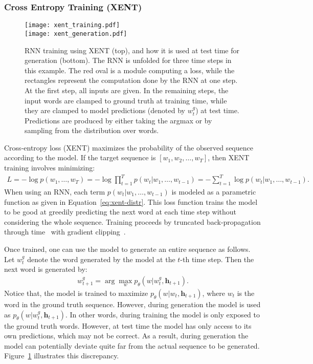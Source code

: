 \documentclass{article} \usepackage{iclr2016_conference,times}
\newcommand{\argmax}{\arg\!\max}
\newcommand{\bh}{\mathbf{h}}
\begin{document}
\subsubsection{Cross Entropy Training (XENT)} \label{model-xent}
\begin{figure}[!t]
	   \texttt{[image: xent\_training.pdf]}\\
	   \texttt{[image: xent\_generation.pdf]}
  \caption{RNN training using XENT (top), and how it is used at test time for generation (bottom). The RNN is unfolded for three time steps in this example. The red oval is a module computing a loss, while the rectangles represent the computation done by the RNN at one step. At the first step, all inputs are given. In the remaining steps, the input words are clamped to ground truth at training time, while they are clamped to model predictions (denoted by $w^g_t$) at test time. Predictions are produced by either taking the argmax or by sampling from the distribution over words. 
}
  \label{fig:xent}
\end{figure}
Cross-entropy loss (XENT) maximizes the probability of the observed sequence according to the model.
If the target sequence is $[w_1, w_2, \dots, w_T]$, then XENT training involves minimizing: 
\begin{align}
L =	- \log p(w_1, \ldots, w_T) = - \log \prod_{t=1}^T p(w_t | w_1, \ldots, w_{t-1}) = - \sum_{t=1}^T \log p(w_t | w_1, \ldots, w_{t-1}).  \label{eq:xenty}
\end{align}
When using an RNN, each term $p(w_t | w_1, \ldots, w_{t-1})$ is modeled as a parametric function as given in Equation~\eqref{eq:xent-distr}. This loss function trains the model to be good at greedily predicting the next word at each time step without considering the whole sequence. Training proceeds by truncated back-propagation through time~\citep{bptt} with gradient clipping~\citep{mikolov-2010}.

Once trained, one can use the model to generate an entire sequence as follows. Let $w^g_t$ denote the word generated by the model at the $t$-th time step. Then the next word  is generated by: 
\begin{align}
  \label{eq:greedy_gen}
  w^g_{t + 1} = \argmax_w p_{\theta}(w | w^g_t, \bh_{t+1}).
\end{align}
Notice that, the model is trained
to maximize $p_{\theta}(w | w_t, \bh_{t+1})$, where $w_t$ is the word in the ground truth sequence. However, during generation the model is used as  
$p_{\theta}(w | w^g_t, \bh_{t+1})$. In other words, during training the model is only exposed 
to the ground truth words. However, at test time the model has only
access to its own predictions, which may not be correct. As a result, during generation the model can potentially deviate quite far from the actual sequence to be generated. Figure~\ref{fig:xent} illustrates this discrepancy. 
\end{document}
